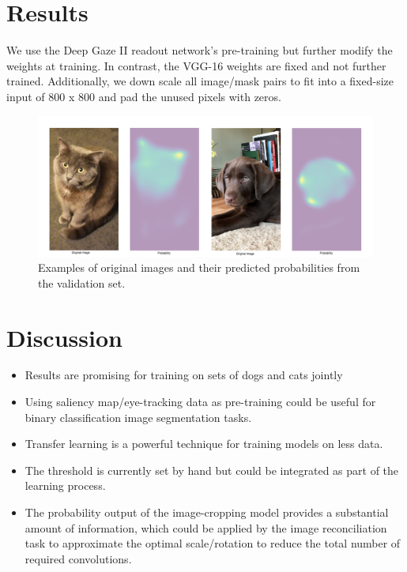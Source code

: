 \documentclass[portrait]{sciposter}
\begin{document}
\begin{multicols}{2}
\section*{Results}
  We use the Deep Gaze II readout network's pre-training but further modify the weights at training. In contrast, the VGG-16 weights are fixed and not further trained. Additionally, we down scale all image/mask pairs to fit into a fixed-size input of 800 x 800 and pad the unused pixels with zeros. 


\begin{figure}
\centering
\includegraphics[width=\textwidth]{all_results_cropped_bot.png}
\caption{\small Examples of original images and their predicted probabilities from the validation set.}
\end{figure}





\section*{Discussion}
\begin{itemize}
	\item Results are promising for training on sets of dogs and cats jointly
	\item Using saliency map/eye-tracking data as pre-training could be useful for binary classification image segmentation tasks.
	\item Transfer learning is a powerful technique for training models on less data.
	\item The threshold is currently set by hand but could be integrated as part of the learning process.
	\item The probability output of the image-cropping model provides a substantial amount of information, which could be applied by the image reconciliation task to approximate the optimal scale/rotation to reduce the total number of required convolutions.
\end{itemize}



\end{multicols}
\end{document}
